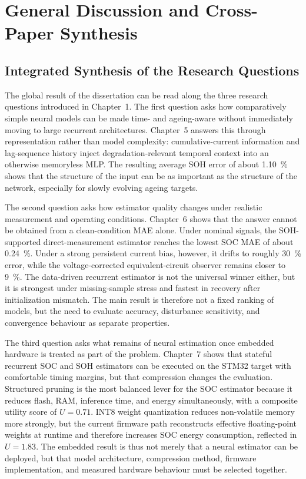 \documentclass[
    a4paper,
    12pt,
    titlepage,
    bibliography=totoc,
    twoside=on,
    parskip=false,
    numbers=noenddot,
    cleardoublepage=empty,
    DIV=12,
    BCOR=12.0mm,
    headheight=36pt,
    headings=openright
]{scrreprt}
\begin{document}
\chapter{General Discussion and Cross-Paper Synthesis}
\section{Integrated Synthesis of the Research Questions}
The global result of the dissertation can be read along the three research questions introduced in Chapter~1. The first question asks how comparatively simple neural models can be made time- and ageing-aware without immediately moving to large recurrent architectures. Chapter~5 answers this through representation rather than model complexity: cumulative-current information and lag-sequence history inject degradation-relevant temporal context into an otherwise memoryless MLP. The resulting average SOH error of about \SI{1.10}{\percent} shows that the structure of the input can be as important as the structure of the network, especially for slowly evolving ageing targets.

The second question asks how estimator quality changes under realistic measurement and operating conditions. Chapter~6 shows that the answer cannot be obtained from a clean-condition MAE alone. Under nominal signals, the SOH-supported direct-measurement estimator reaches the lowest SOC MAE of about \SI{0.24}{\percent}. Under a strong persistent current bias, however, it drifts to roughly \SI{30}{\percent} error, while the voltage-corrected equivalent-circuit observer remains closer to \SI{9}{\percent}. The data-driven recurrent estimator is not the universal winner either, but it is strongest under missing-sample stress and fastest in recovery after initialization mismatch. The main result is therefore not a fixed ranking of models, but the need to evaluate accuracy, disturbance sensitivity, and convergence behaviour as separate properties.

The third question asks what remains of neural estimation once embedded hardware is treated as part of the problem. Chapter~7 shows that stateful recurrent SOC and SOH estimators can be executed on the STM32 target with comfortable timing margins, but that compression changes the evaluation. Structured pruning is the most balanced lever for the SOC estimator because it reduces flash, RAM, inference time, and energy simultaneously, with a composite utility score of $U=0.71$. INT8 weight quantization reduces non-volatile memory more strongly, but the current firmware path reconstructs effective floating-point weights at runtime and therefore increases SOC energy consumption, reflected in $U=1.83$. The embedded result is thus not merely that a neural estimator can be deployed, but that model architecture, compression method, firmware implementation, and measured hardware behaviour must be selected together.
\end{document}

